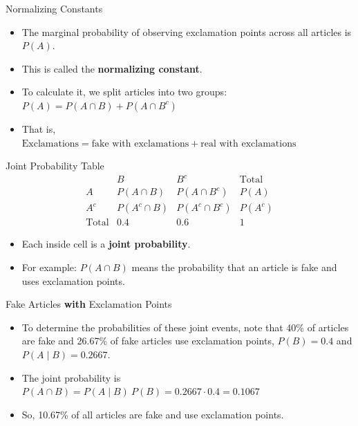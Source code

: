 \documentclass[12pt]{beamer}
\begin{document}
\begin{frame}{}
\begin{block}{Normalizing Constants}
\begin{itemize}
    \item The marginal probability of observing exclamation points across all articles is $P(A)$.
    \item This is called the \textbf{normalizing constant}.
    \item To calculate it, we split articles into two groups:\\
          \hspace{2cm}$P(A)=P(A \cap B)+P(A \cap B^c)$
    \item That is,\\ \mbox{$\text{Exclamations} = \text{fake with exclamations} + \text{real with exclamations}$}
\end{itemize}
\end{block}
\end{frame}

\begin{frame}{}
\begin{block}{Joint Probability Table}
\[
\begin{array}{c|ccc}
 & B & B^c & \text{Total} \\
\hline
A & P(A \cap B) & P(A \cap B^c) & P(A) \\
A^c & P(A^c \cap B) & P(A^c \cap B^c) & P(A^c) \\
\hline
\text{Total} & 0.4 & 0.6 & 1
\end{array}
\]
\vspace{0.2cm}
\begin{itemize}
    \item Each inside cell is a \textbf{joint probability}.
    \item For example: $P(A \cap B)$ means the probability that an article is fake and uses exclamation points.
\end{itemize}
\end{block}
\end{frame}

\begin{frame}{}
\begin{block}{Fake Articles \textbf{with} Exclamation Points}
\begin{itemize}
    \item To determine the probabilities of these joint events, note that 40\% of articles are fake and 26.67\% of fake articles use exclamation points, $P(B) = 0.4$ and $P(A \mid B) = 0.2667$. 
    \item The joint probability is
    $P(A \cap B) = P(A \mid B) ~ P(B) = 0.2667 \cdot 0.4 = 0.1067$
    \item So, 10.67\% of all articles are fake and use exclamation points.
\end{itemize}
\end{block}
\end{frame}
\end{document}
